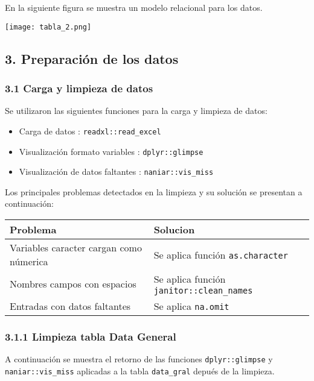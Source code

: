 \documentclass[
]{article}
\providecommand{\tightlist}{%
  \setlength{\itemsep}{0pt}\setlength{\parskip}{0pt}}
\begin{document}
En la siguiente figura se muestra un modelo relacional para los datos.

\texttt{[image: tabla\_2.png]}

\hypertarget{preparaciuxf3n-de-los-datos}{%
\subsection{3. Preparación de los
datos}\label{preparaciuxf3n-de-los-datos}}

\hypertarget{carga-y-limpieza-de-datos}{%
\subsubsection{3.1 Carga y limpieza de
datos}\label{carga-y-limpieza-de-datos}}

Se utilizaron las siguientes funciones para la carga y limpieza de
datos:

\begin{itemize}
\tightlist
\item
  Carga de datos : \texttt{readxl::read\_excel}
\item
  Visualización formato variables : \texttt{dplyr::glimpse}
\item
  Visualización de datos faltantes : \texttt{naniar::vis\_miss}
\end{itemize}

Los principales problemas detectados en la limpieza y su solución se
presentan a continuación:

\begin{longtable}[]{@{}ll@{}}
\toprule
Problema & Solucion \\
\midrule
\endhead
Variables caracter cargan como númerica & Se aplica función
\texttt{as.character} \\
Nombres campos con espacios & Se aplica función
\texttt{janitor::clean\_names} \\
Entradas con datos faltantes & Se aplica \texttt{na.omit} \\
\bottomrule
\end{longtable}

\hypertarget{limpieza-tabla-data-general}{%
\subsubsection{3.1.1 Limpieza tabla Data
General}\label{limpieza-tabla-data-general}}

A continuación se muestra el retorno de las funciones
\texttt{dplyr::glimpse} y \texttt{naniar::vis\_miss} aplicadas a la
tabla \texttt{data\_gral} depués de la limpieza.
\end{document}
